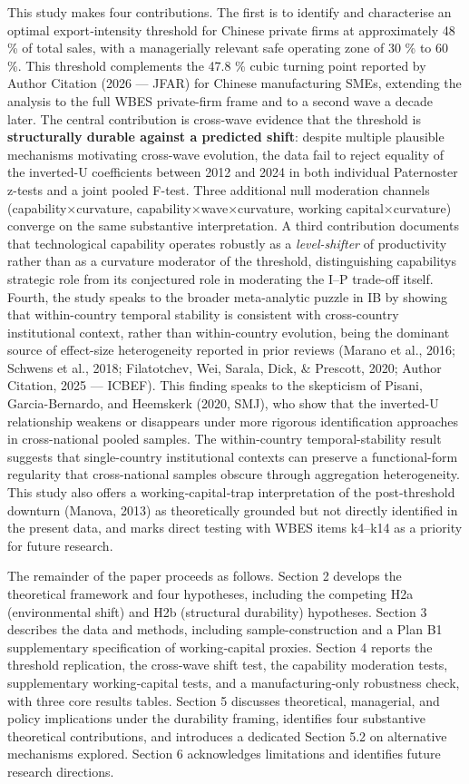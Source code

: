 \documentclass[12pt,a4paper]{article}
\begin{document}
This study makes four contributions. The first is to identify and
characterise an optimal export‑intensity threshold for Chinese private
firms at approximately 48 \% of total sales, with a managerially
relevant safe operating zone of 30 \% to 60 \%. This threshold
complements the 47.8 \% cubic turning point reported by Author Citation
(2026 --- JFAR) for Chinese manufacturing SMEs, extending the analysis
to the full WBES private-firm frame and to a second wave a decade later.
The central contribution is cross‑wave evidence that the threshold is
\textbf{structurally durable against a predicted shift}: despite
multiple plausible mechanisms motivating cross-wave evolution, the data
fail to reject equality of the inverted-U coefficients between 2012 and
2024 in both individual Paternoster z-tests and a joint pooled F-test.
Three additional null moderation channels (capability×curvature,
capability×wave×curvature, working capital×curvature) converge on the
same substantive interpretation. A third contribution documents that
technological capability operates robustly as a \emph{level-shifter} of
productivity rather than as a curvature moderator of the threshold,
distinguishing capability\textquotesingle s strategic role from its
conjectured role in moderating the I--P trade-off itself. Fourth, the
study speaks to the broader meta-analytic puzzle in IB by showing that
within-country temporal stability is consistent with cross-country
institutional context, rather than within-country evolution, being the
dominant source of effect-size heterogeneity reported in prior reviews
(Marano et al., 2016; Schwens et al., 2018; Filatotchev, Wei, Sarala,
Dick, \& Prescott, 2020; Author Citation, 2025 --- ICBEF). This finding
speaks to the skepticism of Pisani, Garcia-Bernardo, and Heemskerk
(2020, SMJ), who show that the inverted-U relationship weakens or
disappears under more rigorous identification approaches in
cross-national pooled samples. The within-country temporal-stability
result suggests that single-country institutional contexts can preserve
a functional-form regularity that cross-national samples obscure through
aggregation heterogeneity. This study also offers a working‑capital‑trap
interpretation of the post‑threshold downturn (Manova, 2013) as
theoretically grounded but not directly identified in the present data,
and marks direct testing with WBES items k4--k14 as a priority for
future research.

The remainder of the paper proceeds as follows. Section 2 develops the
theoretical framework and four hypotheses, including the competing H2a
(environmental shift) and H2b (structural durability) hypotheses.
Section 3 describes the data and methods, including sample-construction
and a Plan B1 supplementary specification of working‑capital proxies.
Section 4 reports the threshold replication, the cross‑wave shift test,
the capability moderation tests, supplementary working‑capital tests,
and a manufacturing-only robustness check, with three core results
tables. Section 5 discusses theoretical, managerial, and policy
implications under the durability framing, identifies four substantive
theoretical contributions, and introduces a dedicated Section 5.2 on
alternative mechanisms explored. Section 6 acknowledges limitations and
identifies future research directions.
\end{document}
